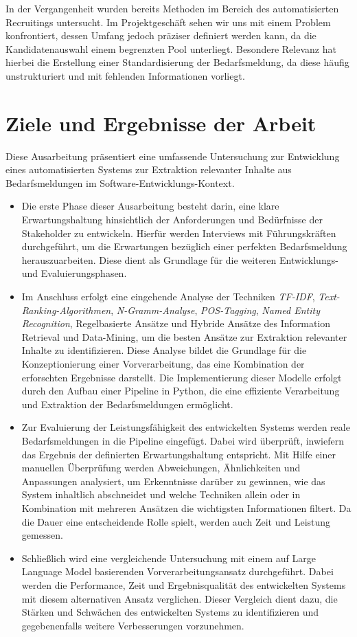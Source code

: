 \documentclass[a4paper,12pt]{scrreprt}
\newcommand{\hiddenchapter}[1]{
	\chapter*{{#1}}
}
\begin{document}
In der Vergangenheit wurden bereits Methoden im Bereich des automatisierten Recruitings untersucht. Im Projektgeschäft sehen wir uns mit einem Problem konfrontiert, dessen Umfang jedoch präziser definiert werden kann, da die Kandidatenauswahl einem begrenzten Pool unterliegt. Besondere Relevanz hat hierbei die Erstellung einer Standardisierung der Bedarfsmeldung, da diese häufig unstrukturiert und mit fehlenden Informationen vorliegt.
\hiddenchapter{Ziele und Ergebnisse der Arbeit}
Diese Ausarbeitung präsentiert eine umfassende Untersuchung zur Entwicklung eines automatisierten Systems zur Extraktion relevanter Inhalte aus Bedarfsmeldungen im Software-Entwicklungs-Kontext.
\begin{itemize}
	\item Die erste Phase dieser Ausarbeitung besteht darin, eine klare Erwartungshaltung hinsichtlich der Anforderungen und Bedürfnisse der Stakeholder zu entwickeln. Hierfür werden Interviews mit Führungskräften durchgeführt, um die Erwartungen bezüglich einer \glqq{}perfekten\grqq{} Bedarfsmeldung herauszuarbeiten. Diese dient als Grundlage für die weiteren Entwicklungs- und Evaluierungsphasen.
	\item Im Anschluss erfolgt eine eingehende Analyse der Techniken \emph{TF-IDF}, \emph{Text-Ranking-Algorithmen}, \emph{N-Gramm-Analyse}, \emph{POS-Tagging}, \emph{Named Entity Recognition}, Regelbasierte Ansätze und Hybride Ansätze des Information Retrieval und Data-Mining, um die besten Ansätze zur Extraktion relevanter Inhalte zu identifizieren. Diese Analyse bildet die Grundlage für die Konzeptionierung einer Vorverarbeitung, das eine Kombination der erforschten Ergebnisse darstellt. Die Implementierung dieser Modelle erfolgt durch den Aufbau einer Pipeline in Python, die eine effiziente Verarbeitung und Extraktion der Bedarfsmeldungen ermöglicht.
	\item Zur Evaluierung der Leistungsfähigkeit des entwickelten Systems werden reale Bedarfsmeldungen in die Pipeline eingefügt. Dabei wird überprüft, inwiefern das Ergebnis der definierten Erwartungshaltung entspricht. Mit Hilfe einer manuellen Überprüfung werden Abweichungen, Ähnlichkeiten und Anpassungen analysiert, um Erkenntnisse darüber zu gewinnen, wie das System inhaltlich abschneidet und welche Techniken allein oder in Kombination mit mehreren Ansätzen die wichtigsten Informationen filtert. Da die Dauer eine entscheidende Rolle spielt, werden auch Zeit und Leistung gemessen.
	\item Schließlich wird eine vergleichende Untersuchung mit einem auf Large Language Model basierenden Vorverarbeitungsansatz durchgeführt. Dabei werden die Performance, Zeit und Ergebnisqualität des entwickelten Systems mit diesem alternativen Ansatz verglichen. Dieser Vergleich dient dazu, die Stärken und Schwächen des entwickelten Systems zu identifizieren und gegebenenfalls weitere Verbesserungen vorzunehmen.
\end{itemize}
\end{document}
